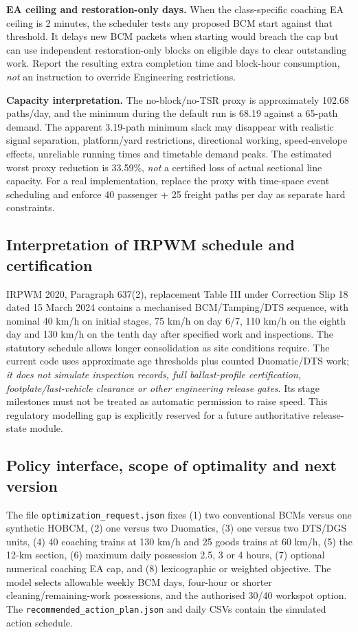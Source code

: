 \documentclass[10pt,a4paper]{article}
\begin{document}
\textbf{EA ceiling and restoration-only days.} When the class-specific coaching EA ceiling is 2 minutes, the scheduler tests any proposed BCM start against that threshold. It delays new BCM packets when starting would breach the cap but can use independent restoration-only blocks on eligible days to clear outstanding work. Report the resulting extra completion time and block-hour consumption, \emph{not} an instruction to override Engineering restrictions.

\textbf{Capacity interpretation.} The no-block/no-TSR proxy is approximately 102.68 paths/day, and the minimum during the default run is 68.19 against a 65-path demand. The apparent 3.19-path minimum slack may disappear with realistic signal separation, platform/yard restrictions, directional working, speed-envelope effects, unreliable running times and timetable demand peaks. The estimated worst proxy reduction is 33.59\%, \emph{not} a certified loss of actual sectional line capacity. For a real implementation, replace the proxy with time-space event scheduling and enforce 40 passenger + 25 freight paths per day as separate hard constraints.

\subsection{Interpretation of IRPWM schedule and certification}
IRPWM 2020, Paragraph 637(2), replacement Table III under Correction Slip 18 dated 15 March 2024 contains a mechanised BCM/Tamping/DTS sequence, with nominal 40 km/h on initial stages, 75 km/h on day 6/7, 110 km/h on the eighth day and 130 km/h on the tenth day after specified work and inspections. The statutory schedule allows longer consolidation as site conditions require. The current code uses approximate age thresholds plus counted Duomatic/DTS work; \emph{it does not simulate inspection records, full ballast-profile certification, footplate/last-vehicle clearance or other engineering release gates}. Its stage milestones must not be treated as automatic permission to raise speed. This regulatory modelling gap is explicitly reserved for a future authoritative release-state module.

\subsection{Policy interface, scope of optimality and next version}
The file \texttt{optimization\_request.json} fixes (1) two conventional BCMs versus one synthetic HOBCM, (2) one versus two Duomatics, (3) one versus two DTS/DGS units, (4) 40 coaching trains at 130 km/h and 25 goods trains at 60 km/h, (5) the 12-km section, (6) maximum daily possession 2.5, 3 or 4 hours, (7) optional numerical coaching EA cap, and (8) lexicographic or weighted objective. The model selects allowable weekly BCM days, four-hour or shorter cleaning/remaining-work possessions, and the authorised 30/40 workspot option. The \texttt{recommended\_action\_plan.json} and daily CSVs contain the simulated action schedule.
\end{document}
